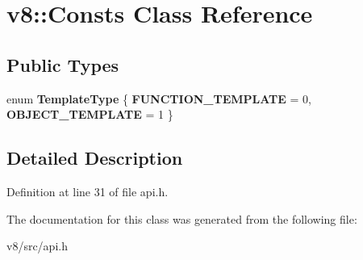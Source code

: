 \hypertarget{classv8_1_1Consts}{}\section{v8\+:\+:Consts Class Reference}
\label{classv8_1_1Consts}
\subsection*{Public Types}
\begin{DoxyCompactItemize}
\item 
\mbox{\label{classv8_1_1Consts_afcb83e41645c657b000300603982965c}} 
enum {\bfseries Template\+Type} \{ {\bfseries F\+U\+N\+C\+T\+I\+O\+N\+\_\+\+T\+E\+M\+P\+L\+A\+TE} = 0, 
{\bfseries O\+B\+J\+E\+C\+T\+\_\+\+T\+E\+M\+P\+L\+A\+TE} = 1
 \}
\end{DoxyCompactItemize}


\subsection{Detailed Description}


Definition at line 31 of file api.\+h.



The documentation for this class was generated from the following file\+:\begin{DoxyCompactItemize}
\item 
v8/src/api.\+h\end{DoxyCompactItemize}
